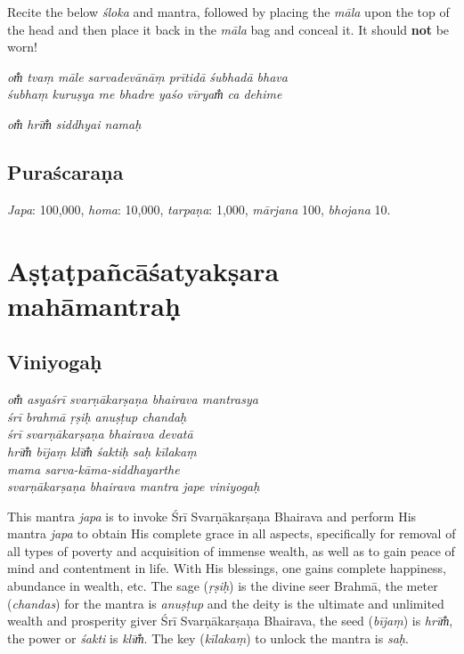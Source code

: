 \documentclass[12pt,oneside,a4paper]{article}
\newenvironment{shloka}[1]
  {\bigskip\center#1\varwidth{\linewidth}}
  {\endvarwidth\endcenter\bigskip}
\newcommand{\tl}[1]{\emph{#1}}
\begin{document}
Recite the below \tl{śloka} and mantra, followed by placing the \tl{māla} upon
the top of the head and then place it back in the \tl{māla} bag and conceal it.
It should \textbf{not} be worn!

\begin{shloka}\itshape
  om̐ tvaṃ māle sarvadevānāṃ prītidā śubhadā bhava\\
  śubhaṃ kuruṣya me bhadre yaśo vīryam̐ ca dehime
\end{shloka}

\begin{shloka}\itshape
  om̐ hrīm̐ siddhyai namaḥ
\end{shloka}

\subsection{Puraścaraṇa}

\tl{Japa}: 100,000, \tl{homa}: 10,000, \tl{tarpaṇa}: 1,000, \tl{mārjana} 100,
\tl{bhojana} 10.
\clearpage

\section{Aṣṭaṭpañcāśatyakṣara mahāmantraḥ}

\subsection{Viniyogaḥ}

\begin{shloka}\itshape
  om̐ asyaśrī svarṇākarṣaṇa bhairava mantrasya\\
  śrī brahmā ṛṣiḥ anuṣṭup chandaḥ\\
  śrī svarṇākarṣaṇa bhairava devatā\\
  hrīm̐ bījaṃ klīm̐ śaktiḥ saḥ kīlakaṃ\\
  mama sarva-kāma-siddhayarthe\\
  svarṇākarṣaṇa bhairava mantra jape viniyogaḥ
\end{shloka}

This mantra \tl{japa} is to invoke Śrī Svarṇākarṣaṇa Bhairava and perform His
mantra \tl{japa} to obtain His complete grace in all aspects, specifically for
removal of all types of poverty and acquisition of immense wealth, as well as
to gain peace of mind and contentment in life. With His blessings, one gains
complete happiness, abundance in wealth, etc. The sage (\tl{ṛṣiḥ}) is the divine
seer Brahmā, the meter (\tl{chandas}) for the mantra is \tl{anuṣṭup} and
the deity is the ultimate and unlimited wealth and prosperity giver Śrī
Svarṇākarṣaṇa Bhairava, the seed (\tl{bījaṃ}) is \tl{hrīm̐}, the power or
\tl{śakti} is \tl{klīm̐}. The key (\tl{kīlakaṃ}) to unlock the mantra
is \tl{saḥ}.
\end{document}
